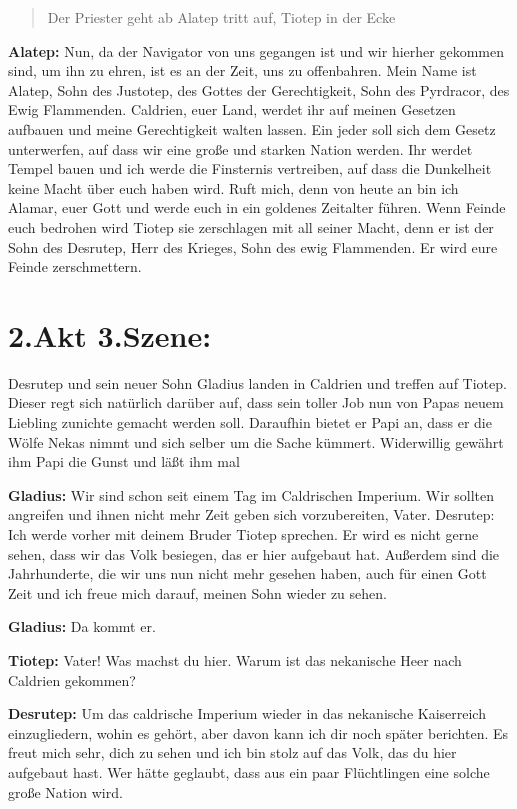 \documentclass[a5paper,6pt]{book}
\begin{document}
\begin{quote}
Der Priester geht ab Alatep tritt auf, Tiotep in der Ecke
\end{quote}

\textbf{Alatep:} Nun, da der Navigator von uns gegangen ist und wir hierher gekommen sind, um ihn
zu ehren, ist es an der Zeit, uns zu offenbahren. Mein Name ist Alatep, Sohn des Justotep, des
Gottes der Gerechtigkeit, Sohn des Pyrdracor, des Ewig Flammenden. Caldrien, euer Land,
werdet ihr auf meinen Gesetzen aufbauen und meine Gerechtigkeit walten lassen. Ein jeder
soll sich dem Gesetz unterwerfen, auf dass wir eine große und starken Nation werden. Ihr
werdet Tempel bauen und ich werde die Finsternis vertreiben, auf dass die Dunkelheit keine
Macht über euch haben wird. Ruft mich, denn von heute an bin ich Alamar, euer Gott und
werde euch in ein goldenes Zeitalter führen. Wenn Feinde euch bedrohen wird Tiotep sie
zerschlagen mit all seiner Macht, denn er ist der Sohn des Desrutep, Herr des Krieges, Sohn
des ewig Flammenden. Er wird eure Feinde zerschmettern.

\section{2.Akt 3.Szene:}

Desrutep und sein neuer Sohn Gladius landen in Caldrien und treffen auf Tiotep. Dieser
regt sich natürlich darüber auf, dass sein toller Job nun von Papas neuem Liebling zunichte
gemacht werden soll. Daraufhin bietet er Papi an, dass er die Wölfe Nekas nimmt und sich
selber um die Sache kümmert. Widerwillig gewährt ihm Papi die Gunst und läßt ihm mal

\textbf{Gladius:} Wir sind schon seit einem Tag im Caldrischen Imperium. Wir sollten angreifen und
ihnen nicht mehr Zeit geben sich vorzubereiten, Vater.
Desrutep: Ich werde vorher mit deinem Bruder Tiotep sprechen. Er wird es nicht gerne sehen,
dass wir das Volk besiegen, das er hier aufgebaut hat. Außerdem sind die
Jahrhunderte, die wir uns nun nicht mehr gesehen haben, auch für einen Gott Zeit und
ich freue mich darauf, meinen Sohn wieder zu sehen.

\textbf{Gladius:} Da kommt er.

\textbf{Tiotep:} Vater! Was machst du hier. Warum ist das nekanische Heer nach Caldrien
gekommen?

\textbf{Desrutep:} Um das caldrische Imperium wieder in das nekanische Kaiserreich einzugliedern,
wohin es gehört, aber davon kann ich dir noch später berichten. Es freut mich sehr,
dich zu sehen und ich bin stolz auf das Volk, das du hier aufgebaut hast. Wer hätte
geglaubt, dass aus ein paar Flüchtlingen eine solche große Nation wird.
\end{document}
